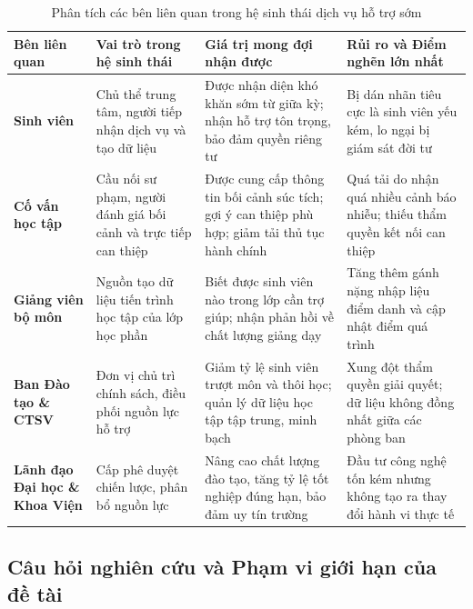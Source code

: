 \begin{table}[htbp]
\centering
\caption{Phân tích các bên liên quan trong hệ sinh thái dịch vụ hỗ trợ sớm}
\label{tab:ben_lien_quan}
\vspace{0.2cm}
\begin{tabularx}{\textwidth}{|L{2.5cm}|Y|Y|Y|}
\hline
\textbf{Bên liên quan} & \textbf{Vai trò trong hệ sinh thái} & \textbf{Giá trị mong đợi nhận được} & \textbf{Rủi ro và Điểm nghẽn lớn nhất} \\
\hline
\textbf{Sinh viên} & Chủ thể trung tâm, người tiếp nhận dịch vụ và tạo dữ liệu & Được nhận diện khó khăn sớm từ giữa kỳ; nhận hỗ trợ tôn trọng, bảo đảm quyền riêng tư & Bị dán nhãn tiêu cực là sinh viên yếu kém, lo ngại bị giám sát đời tư \\
\hline
\textbf{Cố vấn học tập} & Cầu nối sư phạm, người đánh giá bối cảnh và trực tiếp can thiệp & Được cung cấp thông tin bối cảnh súc tích; gợi ý can thiệp phù hợp; giảm tải thủ tục hành chính & Quá tải do nhận quá nhiều cảnh báo nhiễu; thiếu thẩm quyền kết nối can thiệp \\
\hline
\textbf{Giảng viên bộ môn} & Nguồn tạo dữ liệu tiến trình học tập của lớp học phần & Biết được sinh viên nào trong lớp cần trợ giúp; nhận phản hồi về chất lượng giảng dạy & Tăng thêm gánh nặng nhập liệu điểm danh và cập nhật điểm quá trình \\
\hline
\textbf{Ban Đào tạo \& CTSV} & Đơn vị chủ trì chính sách, điều phối nguồn lực hỗ trợ & Giảm tỷ lệ sinh viên trượt môn và thôi học; quản lý dữ liệu học tập tập trung, minh bạch & Xung đột thẩm quyền giải quyết; dữ liệu không đồng nhất giữa các phòng ban \\
\hline
\textbf{Lãnh đạo Đại học \& Khoa Viện} & Cấp phê duyệt chiến lược, phân bổ nguồn lực & Nâng cao chất lượng đào tạo, tăng tỷ lệ tốt nghiệp đúng hạn, bảo đảm uy tín trường & Đầu tư công nghệ tốn kém nhưng không tạo ra thay đổi hành vi thực tế \\
\hline
\end{tabularx}
\end{table}

\subsection{Câu hỏi nghiên cứu và Phạm vi giới hạn của đề tài}


